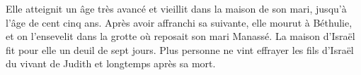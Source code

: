 Elle atteignit un âge très avancé et vieillit dans la maison de son mari,
	jusqu’à l’âge de cent cinq ans.
Après avoir affranchi sa suivante, elle mourut à Béthulie,
	et on l’ensevelit dans la grotte où reposait son mari Manassé.
La maison d’Israël fit pour elle un deuil de sept jours.
Plus personne ne vint effrayer les fils d’Israël du vivant de Judith
	et longtemps après sa mort.

